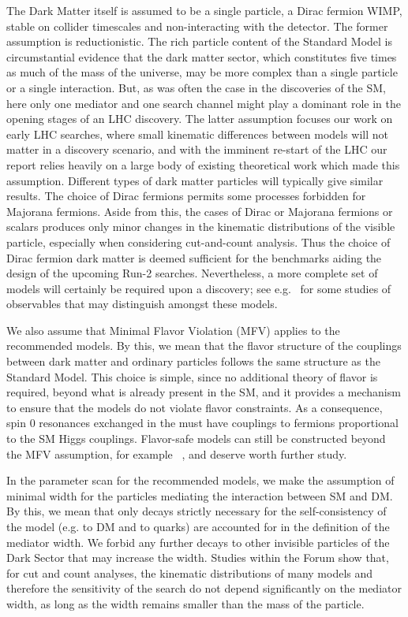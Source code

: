 The Dark Matter itself is assumed to be a single particle, a Dirac
fermion WIMP, stable on collider timescales and non-interacting with
the detector. The former assumption is reductionistic. The rich
particle content of the Standard Model is circumstantial evidence that
the dark matter sector, which constitutes five times as much of the
mass of the universe, may be more complex than a single particle or a
single interaction. But, as was often the case in the discoveries of
the SM, here only one mediator and one search channel might play a
dominant role in the opening stages of an LHC discovery. The latter
assumption focuses our work on early LHC searches, where small
kinematic differences between models will not matter in a discovery
scenario, and with the imminent re-start of the LHC our report relies
heavily on a large body of existing theoretical work which made this
assumption. Different types of dark matter particles will typically
give similar results. The choice of Dirac fermions permits some
processes forbidden for Majorana fermions. Aside from this, the cases
of Dirac or Majorana fermions or scalars produces only minor changes
in the kinematic distributions of the visible particle, especially
when considering cut-and-count analysis. Thus the choice of Dirac
fermion dark matter is deemed sufficient for the benchmarks aiding the
design of the upcoming Run-2 searches. Nevertheless, a more complete
set of models will certainly be required upon a discovery; see
e.g.~\cite{Cotta:2012nj,Haisch:2013fla,Crivellin:2015wva} for some
studies of observables that may distinguish amongst these models.

We also assume that Minimal Flavor Violation (MFV) \cite{Chivukula:1987py,Hall:1990ac,Buras:2000dm,D'Ambrosio:2002ex} applies to the
recommended models. By this, we mean that the flavor structure of the
couplings between dark matter and ordinary particles follows the same
structure as the Standard Model. This choice is simple, since no
additional theory of flavor is required, beyond what is already
present in the SM, and it provides a mechanism to ensure that the
models do not violate flavor constraints.  As a consequence, spin 0
resonances exchanged in the \schannel must have couplings to fermions proportional to the SM Higgs couplings. Flavor-safe models can still be constructed beyond the MFV
assumption, for example ~\cite{Agrawal:2014aoa}, and deserve worth further study.

In the parameter scan for the recommended models, we make the
assumption of minimal width for the particles mediating the
interaction between SM and DM.  By this, we mean that only decays
strictly necessary for the self-consistency of the model (e.g.  to DM
and to quarks) are accounted for in the definition of the mediator
width. We forbid any further decays to other invisible particles of
the Dark Sector that may increase the width. Studies within the Forum
show that, for cut and count analyses, the kinematic distributions of
many models and therefore the sensitivity of the search do not depend
significantly on the mediator width, as long as the width remains smaller
than the mass of the particle.


